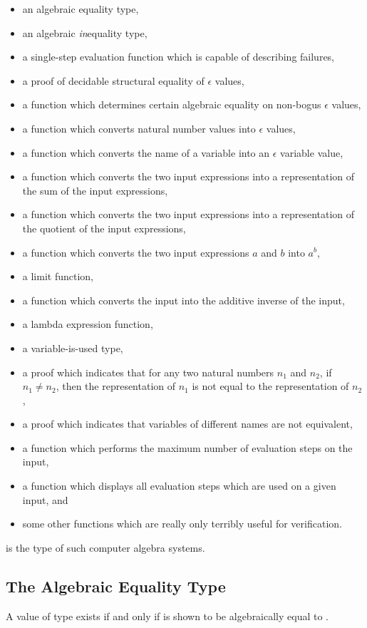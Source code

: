 \documentclass{report}
\begin{document}
\begin{itemize}
  \item an algebraic equality type,
  \item an algebraic \emph{in}equality type,
  \item a single-step evaluation function which is capable of describing failures,
  \item a proof of decidable structural equality of \(\epsilon\) values,
  \item a function which determines certain algebraic equality on non-bogus \(\epsilon\) values,
  \item a function which converts natural number values into \(\epsilon\) values,
  \item a function which converts the name of a variable into an \(\epsilon\) variable value,
  \item a function which converts the two input expressions into a representation of the sum of the input expressions,
  \item a function which converts the two input expressions into a representation of the quotient of the input expressions,
  \item a function which converts the two input expressions \(a\) and \(b\) into \(a^b\),
  \item a limit function,
  \item a function which converts the input into the additive inverse of the input,
  \item a lambda expression function,
  \item a variable-is-used type,
  \item a proof which indicates that for any two natural numbers \(n_1\) and \(n_2\), if \(n_1 \neq n_2\), then the representation of \(n_1\) is not equal to the representation of \(n_2\),
  \item a proof which indicates that variables of different names are not equivalent,
  \item a function which performs the maximum number of evaluation steps on the input,
  \item a function which displays all evaluation steps which are used on a given input, and
  \item some other functions which are really only terribly useful for verification.
\end{itemize}

 is the type of such computer algebra systems.

\subsection{The Algebraic Equality Type}
A value of type     exists if and only if  is shown to be algebraically equal to .
\end{document}
